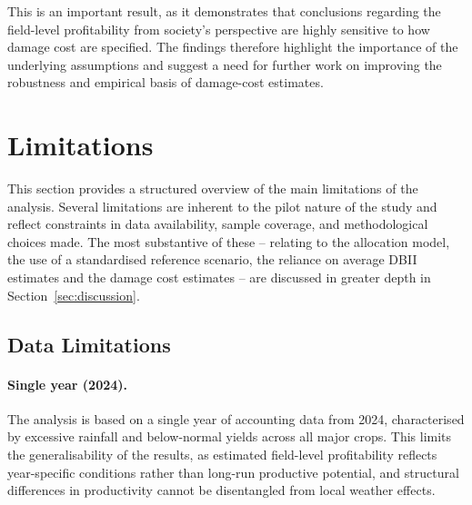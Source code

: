 \documentclass[12pt]{article}
\begin{document}
This is an important result, as it demonstrates that conclusions regarding the field-level profitability from society's perspective are highly sensitive to how damage cost are specified. 
The findings therefore highlight the importance of the underlying assumptions and suggest a need for further work on improving the robustness and empirical basis of damage-cost estimates.






\section{Limitations}
\label{sec:Limitations}

This section provides a structured overview of the main limitations of the analysis. 
Several limitations are inherent to the pilot nature of the study and reflect constraints in data availability, sample coverage, and methodological choices made. 
The most substantive of these -- relating to the allocation model, the use of a standardised reference scenario, the reliance on average DBII estimates and the damage cost estimates -- are discussed in greater depth in Section~\ref{sec:discussion}.

\subsection{Data Limitations}

\paragraph{Single year (2024).}
The analysis is based on a single year of accounting data from 2024, characterised by excessive rainfall and below-normal yields across all major crops. 
This limits the generalisability of the results, as estimated field-level profitability reflects year-specific conditions rather than long-run productive potential, and structural differences in productivity cannot be disentangled from local weather effects.
\end{document}

